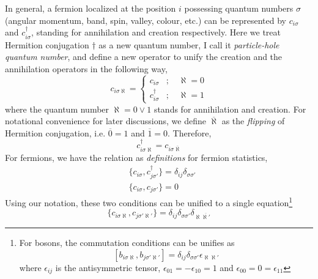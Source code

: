 \documentclass[12font]{article}
\theoremstyle{definition}
\numberwithin{equation}{section}
\newcommand{\llrm}[1]{[  #1  ]}
\newcommand{\llrg}[1]{\{  #1  \}}
\begin{document}
In general, a fermion localized at the position $i$ possessing quantum numbers $\sigma$ (angular momentum, band, spin, valley, colour, etc.) can be represented by $c_{i\sigma}$ and $c_{i\sigma}^\dagger$, standing for annihilation and creation respectively. Here we treat Hermition conjugation $\dagger$ as a new quantum number, I call it \emph{particle-hole quantum number}, and define a new operator to unify the creation and the annihilation operators in the following way,
\begin{equation}\label{uni-def.e}
  c_{i\sigma\aleph} = \begin{cases}
                        c_{i\sigma} &;\quad \aleph=0 \\
                        c_{i\sigma}^\dagger &;\quad \aleph=1
                      \end{cases}
\end{equation}
where the quantum number $\aleph=0\vee 1$ stands for annihilation and creation. For notational convenience for later discussions, we define $\overline{\aleph}$ as the \emph{flipping} of Hermition conjugation, i.e. $\overline{0} = 1$ and $\overline{1}=0$. Therefore,
\begin{equation}\label{flipping-bar.e}
  c_{i\sigma\aleph}^\dagger = c_{i\sigma\overline{\aleph}}
\end{equation}
For fermions, we have the relation as \emph{definitions} for fermion statistics,
\[
\begin{aligned}
& \llrg{c_{i\sigma}, c_{j\sigma'}^\dagger} = \delta_{ij}\delta_{\sigma\sigma'} \\
& \llrg{c_{i\sigma}, c_{j\sigma'}} = 0
\end{aligned}
\]
Using our notation, these two conditions can be unified to a single equation\footnote{For bosons, the commutation conditions can be unifies as
\[
\llrm{b_{i\sigma\aleph},b_{j\sigma'\aleph'}} = \delta_{ij}\delta_{\sigma\sigma'}\epsilon_{\aleph\aleph'}
\]
where $\epsilon_{ij}$ is the antisymmetric tensor, $\epsilon_{01}=-\epsilon_{10} = 1$ and $\epsilon_{00} = 0 = \epsilon_{11}$}
\begin{equation}\label{commutation-def.e}
  \llrg{c_{i\sigma\aleph},c_{j\sigma'\aleph'}} = \delta_{ij}\delta_{\sigma\sigma'}\delta_{\aleph\overline{\aleph'}}
\end{equation}
\end{document}
